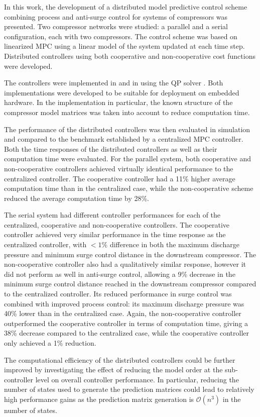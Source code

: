 \label{sec:conclusion}

In this work, the development of a distributed model predictive control scheme combining process and anti-surge control for systems of compressors was presented.
Two compressor networks were studied: a parallel and a serial configuration, each with two compressors.
The control scheme was based on linearized MPC using a linear model of the system updated at each time step.
Distributed controllers using both cooperative and non-cooperative cost functions were developed.

The controllers were implemented in \slink{} and in \cpp{} using the QP solver \qpoases{}.
Both implementations were developed to be suitable for deployment on embedded hardware.
In the \cpp{} implementation in particular, the known structure of the compressor model matrices was taken into account to reduce computation time.

The performance of the distributed controllers was then evaluated in simulation and compared to the benchmark established by a centralized MPC controller.
Both the time responses of the distributed controllers as well as their computation time were evaluated.
For the parallel system, both cooperative and non-cooperative controllers achieved virtually identical performance to the centralized controller.
The cooperative controller had a 11\% higher average computation time than in the centralized case, while the non-cooperative scheme reduced the average computation time by 28\%.

The serial system had different controller performances for each of the centralized, cooperative and non-cooperative controllers.
The cooperative controller achieved very similar performance in the time response as the centralized controller, with $<1\%$ difference in both the maximum discharge pressure and minimum surge control distance in the downstream compressor.
The non-cooperative controller also had a qualitatively similar response, however it did not perform as well in anti-surge control, allowing a 9\% decrease in the minimum surge control distance reached in the downstream compressor compared to the centralized controller.
Its reduced performance in surge control was combined with improved process control: its maximum discharge pressure was 40\% lower than in the centralized case.
Again, the non-cooperative controller outperformed the cooperative controller in terms of computation time, giving a 38\% decrease compared to the centralized case, while the cooperative controller only achieved a 1\% reduction.  

The computational efficiency of the distributed controllers could be further improved by investigating the effect of reducing the model order at the sub-controller level on overall controller performance.
In particular, reducing the number of states used to generate the prediction matrices could lead to relatively high performance gains as the prediction matrix generation is $\mathcal{O}(n^3)$ in the number of states.

